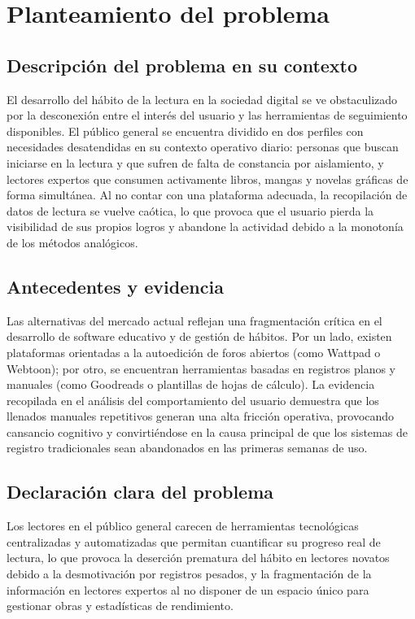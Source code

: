 \documentclass[12pt, atypical, journal]{article}
\begin{document}
\newpage

\section{Planteamiento del problema}

\subsection{Descripción del problema en su contexto}
El desarrollo del hábito de la lectura en la sociedad digital se ve obstaculizado por la desconexión entre el interés del usuario y las herramientas de seguimiento disponibles. El público general se encuentra dividido en dos perfiles con necesidades desatendidas en su contexto operativo diario: personas que buscan iniciarse en la lectura y que sufren de falta de constancia por aislamiento, y lectores expertos que consumen activamente libros, mangas y novelas gráficas de forma simultánea. Al no contar con una plataforma adecuada, la recopilación de datos de lectura se vuelve caótica, lo que provoca que el usuario pierda la visibilidad de sus propios logros y abandone la actividad debido a la monotonía de los métodos analógicos.

\subsection{Antecedentes y evidencia}
Las alternativas del mercado actual reflejan una fragmentación crítica en el desarrollo de software educativo y de gestión de hábitos. Por un lado, existen plataformas orientadas a la autoedición de foros abiertos (como Wattpad o Webtoon); por otro, se encuentran herramientas basadas en registros planos y manuales (como Goodreads o plantillas de hojas de cálculo). La evidencia recopilada en el análisis del comportamiento del usuario demuestra que los llenados manuales repetitivos generan una alta fricción operativa, provocando cansancio cognitivo y convirtiéndose en la causa principal de que los sistemas de registro tradicionales sean abandonados en las primeras semanas de uso.

\subsection{Declaración clara del problema}
Los lectores en el público general carecen de herramientas tecnológicas centralizadas y automatizadas que permitan cuantificar su progreso real de lectura, lo que provoca la deserción prematura del hábito en lectores novatos debido a la desmotivación por registros pesados, y la fragmentación de la información en lectores expertos al no disponer de un espacio único para gestionar obras y estadísticas de rendimiento.
\end{document}
